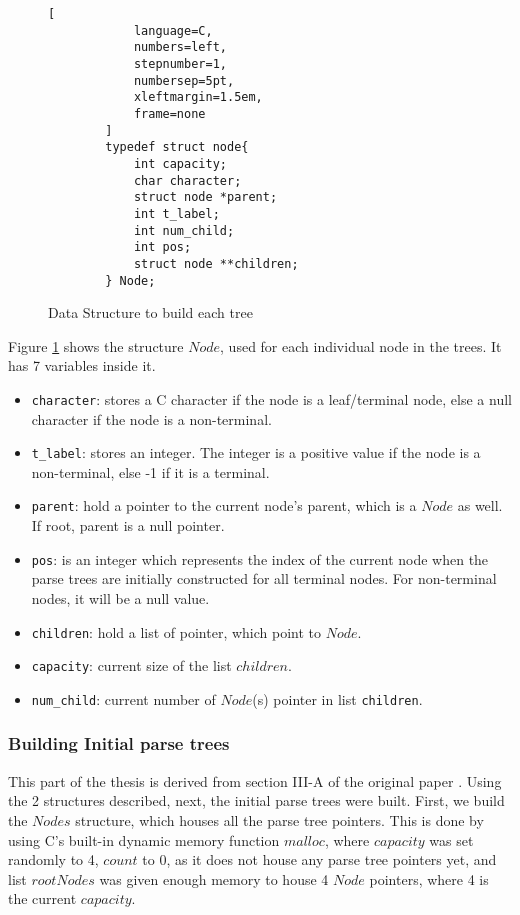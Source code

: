 \begin{figure}[H]

    \begin{tcolorbox}[title=Node Structure to build each tree, colback=white, colframe=black]

        \begin{lstlisting}[
            language=C,
            numbers=left,
            stepnumber=1,
            numbersep=5pt,
            xleftmargin=1.5em,
            frame=none
        ]
        typedef struct node{
            int capacity;
            char character;
            struct node *parent;
            int t_label;
            int num_child;
            int pos;
            struct node **children;
        } Node;
        \end{lstlisting}
    \end{tcolorbox}

\caption{Data Structure to build each tree}
\label{fig:Data_Structures2}
\end{figure}


Figure \ref{fig:Data_Structures2} shows the structure $Node$, used for each individual node in the trees. It has 7 variables inside it. 
\begin{itemize}
    \item \texttt{character}: stores a C character if the node is a leaf/terminal node, else a null character if the node is a non-terminal.
    \item  \texttt{t\_label}: stores an integer. The integer is a positive value if the node is a non-terminal, else -1 if it is a terminal.
    \item \texttt{parent}: hold a pointer to the current node's parent, which is a $Node$ as well. If root, parent is a null pointer.
    \item \texttt{pos}: is an integer which represents the index of the current node when the parse trees are initially constructed for all terminal nodes. For non-terminal nodes, it will be a null value.
    \item \texttt{children}: hold a list of pointer, which point to $Node$.
    \item \texttt{capacity}: current size of the list $children$. 
    \item \texttt{num\_child}: current number of $Node$(s) pointer in list \texttt{children}.
\end{itemize}

\subsubsection{Building Initial parse trees}
This part of the thesis is derived from section III-A of the original paper \cite{kulkarniLearningHighlyRecursive2021}. Using the 2 structures described, next, the initial parse trees were built. First, we build the $Nodes$ structure, which houses all the parse tree pointers. 
This is done by using C's built-in dynamic memory function $malloc$, where $capacity$ was set randomly to 4, $count$ to 0, as it does not house any parse tree pointers yet, and list $rootNodes$ was given enough memory to house 4 $Node$ pointers, where 4 is the current $capacity$. 

